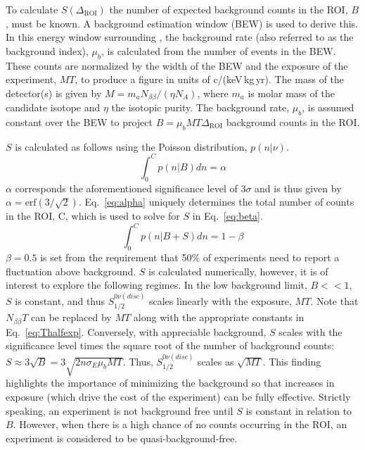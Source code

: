 To calculate $S(\Delta_{\text{ROI}})$ the number of expected background counts in the ROI, $B$, must be known. A background estimation window (BEW) is used to derive this. In this energy window surrounding \Qbb{}, the background rate (also referred to as the background index), $\mu_b$, is calculated from the number of events in the BEW. These counts are normalized by the width of the BEW and the exposure of the experiment, $MT$, to produce a figure in units of c/(keV\,kg\,yr). The mass of the detector(s) is given by $M =  m_aN_{\beta\beta}/(\eta N_A)$, where $m_a$ is molar mass of the candidate isotope and $\eta$ the isotopic purity. The background rate, $\mu_b$, is assumed constant over the BEW to project $B = \mu_bMT\Delta_{\text{ROI}}$ background counts in the ROI.

$S$ is calculated as follows using the Poisson distribution, $p(n|\nu)$.
\begin{equation}
	\int_{0}^{C}p(n|B)dn = \alpha
	\label{eq:alpha}
\end{equation}
$\alpha$ corresponds the aforementioned significance level of 3$\sigma$ and is thus given by $\alpha = \text{erf}(3/\sqrt{2})$. Eq.~\ref{eq:alpha} uniquely determines the total number of counts in the ROI, C, which is used to solve for $S$ in Eq.~\ref{eq:beta}.
\begin{equation}
	\int_{0}^{C}p(n|B+S)dn = 1-\beta
	\label{eq:beta}
\end{equation}
$\beta = 0.5$ is set from the requirement that 50\% of experiments need to report a fluctuation above background. $S$ is calculated numerically, however, it is of interest to explore the following regimes. In the low background limit, $B<<1$, $S$ is constant, and thus $S^{0\nu(disc)}_{1/2}$ scales linearly with the exposure, $MT$. Note that $N_{\beta\beta}T$ can be replaced by $MT$ along with the appropriate constants in Eq.~\ref{eq:Thalfexp}. Conversely, with appreciable background, $S$ scales with the significance level times the square root of the number of background counts: $S \approx 3 \sqrt B = 3\sqrt{2n\sigma_E\mu_bMT}$. Thus, $S^{0\nu(disc)}_{1/2}$ scales as $\sqrt{MT}$. This finding highlights the importance of minimizing the background so that increases in exposure (which drive the cost of the experiment) can be fully effective. Strictly speaking, an experiment is not background free until $S$ is constant in relation to $B$. However, when there is a high chance of no counts occurring in the ROI, an experiment is considered to be quasi-background-free. 

